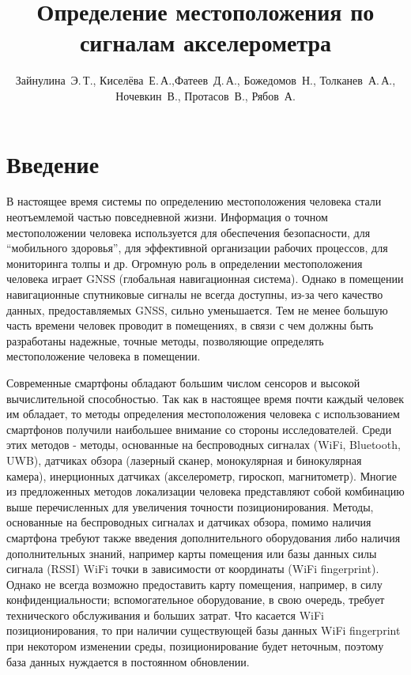 \documentclass[12pt,twoside]{article}
\title
    [Определение местоположения по сигналам акселерометра] 
    {Определение местоположения по сигналам акселерометра}
\author
    [Зайнулина~Э.\,Т.] %
    {Зайнулина~Э.\,Т., Киселёва~Е.\,А.,Фатеев~Д.\,А.,
    Божедомов~Н., Толканев~А.\,А., Ночевкин~В.,
    Протасов~В., Рябов~А.} %
\begin{document}
\maketitle

\section{Введение}
В настоящее время системы по определению местоположения человека стали неотъемлемой частью повседневной жизни. Информация о точном местоположении человека используется для обеспечения безопасности, для ``мобильного здоровья'', для эффективной организации рабочих процессов, для мониторинга толпы и др. Огромную роль в определении местоположения человека играет GNSS (глобальная навигационная система). Однако в помещении навигационные спутниковые сигналы не всегда доступны, из-за чего качество данных, предоставляемых GNSS, сильно уменьшается. Тем не менее большую часть времени человек проводит в помещениях, в связи с чем должны быть разработаны надежные, точные методы, позволяющие определять местоположение человека в помещении.

Современные смартфоны обладают большим числом сенсоров и высокой вычислительной способностью. Так как в настоящее время почти каждый человек им обладает, то методы определения местоположения человека с использованием смартфонов получили наибольшее внимание со стороны исследователей. Среди этих методов - методы, основанные на беспроводных сигналах (WiFi, Bluetooth, UWB)\cite{journals/puc/VeraOA11}\cite{journals/puc/KimJP13}, датчиках обзора (лазерный сканер, монокулярная и бинокулярная камера)\cite{journals/puc/BrunsB09}, инерционных датчиках (акселерометр, гироскоп, магнитометр)\cite{journals/puc/ParkSC13}\cite{journals/puc/HardeggerRT15}\cite{journals/sensors/WangLYJG18}\cite{6987239}. Многие из предложенных методов локализации человека представляют собой комбинацию выше перечисленных для увеличения точности позиционирования\cite{journals/ejasp/EvennouM06}\cite{6834746}\cite{7021969}. Методы, основанные на беспроводных сигналах и датчиках обзора, помимо наличия смартфона требуют также введения дополнительного оборудования либо наличия дополнительных знаний, например карты помещения или базы данных силы сигнала (RSSI) WiFi точки в зависимости от координаты (WiFi fingerprint). Однако не всегда возможно предоставить карту помещения, например, в силу конфиденциальности; вспомогательное оборудование, в свою очередь, требует технического обслуживания и больших затрат. Что касается WiFi позиционирования, то при наличии существующей базы данных WiFi fingerprint при некотором изменении среды, позиционирование будет неточным, поэтому база данных нуждается в постоянном обновлении\cite{journals/sensors/Torres-Sospedra17a}.
\end{document}
